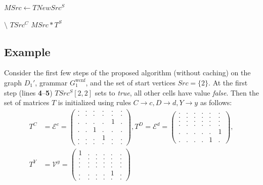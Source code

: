 \begin{algorithm}
\begin{algorithmic}[1]
    \State $MSrc \gets TNewSrc^S$


             $\setminus$ $TSrc^C$
        \EndFor
    \EndWhile
    \State \Return $MSrc*T^S$
\EndFunction


\end{algorithmic}
\end{algorithm}


\subsection{Example}

Consider the first few steps of the proposed algorithm (without caching) on the graph $D_1'$, grammar $G_1^{\text{wcnf}}$, and the set of start vertices $Src = \{2\}$.
At the first step (lines \textbf{4}--\textbf{5}) $TSrc^S[2,2]$ sets to \textit{true}, all other cells have value \textit{false}.
Then the set of matrices $T$ is initialized using rules $C \to c, D \to d, Y \to y$ as follows:
{
    \renewcommand{\arraystretch}{0.7}
    \setlength\arraycolsep{2pt}
\begin{align*}
    T^C& = \mathcal{E}^c =
    \begin{pmatrix}
    . & . & . & . & . & . \\
    . & . & . & . & . & . \\
    . & . & . & . & 1 & . \\
    . & . & 1 & . & . & . \\
    . & . & . & 1 & . & . \\
    . & . & . & . & . & .
\end{pmatrix},
    T^D = \mathcal{E}^d =
    \begin{pmatrix}
    . & . & . & . & . & . \\
    . & . & . & . & . & . \\
    . & . & . & . & . & . \\
    . & . & . & . & . & . \\
    . & . & . & . & . & 1 \\
    . & . & . & . & 1 & .
\end{pmatrix},\\
    T^Y& = \mathcal{V}^y =
    \begin{pmatrix}
    1 & . & . & . & . & . \\
    . & . & . & . & . & . \\
    . & . & . & . & . & . \\
    . & . & . & . & . & . \\
    . & . & . & . & 1 & . \\
    . & . & . & . & . & .
\end{pmatrix}
\end{align*}
}


